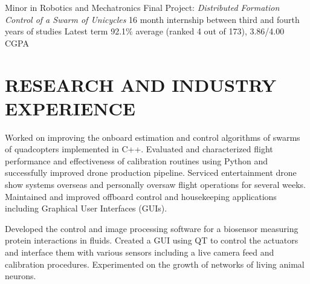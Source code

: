 \documentclass{ResumeTemplate}
\begin{document}



    \workitemsfour
    {Minor in Robotics and Mechatronics}
    {Final Project: \textit{Distributed Formation Control of a Swarm of Unicycles}}
    {16 month internship between third and fourth years of studies}
    {Latest term 92.1\% average (ranked 4 out of 173), 3.86/4.00 CGPA}

    \section{RESEARCH AND INDUSTRY EXPERIENCE}
    

    \workitemsfour
    {Worked on improving the onboard estimation and control algorithms of swarms of quadcopters implemented in C++.}
    {Evaluated and characterized flight performance and effectiveness of calibration routines using Python and successfully improved drone production pipeline.}
    {Serviced entertainment drone show systems overseas and personally oversaw flight operations for several weeks.}
    {Maintained and improved offboard control and housekeeping applications including Graphical User Interfaces (GUIs).}
    
    
    \workitemsthree
    {Developed the control and image processing software for a biosensor measuring protein interactions in fluids.}
    {Created a GUI using QT to control the actuators and interface them with various sensors including a live camera feed and calibration procedures.}
    {Experimented on the growth of networks of living animal neurons.}

\end{document}
